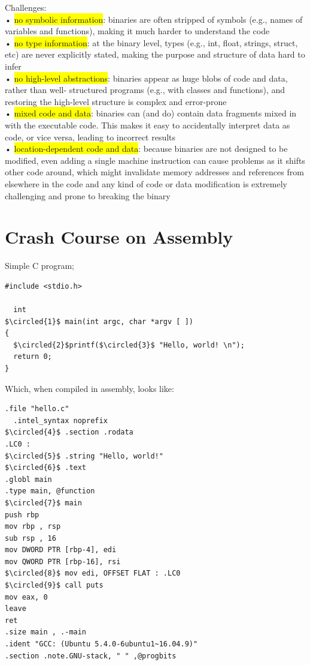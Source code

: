 \documentclass[]{project_plan}
\newcommand*\circled[1]{\tikz[baseline=(char.base)]{
            \node[shape=circle,draw,inner sep=2pt] (char) {#1};}}
\begin{document}
Challenges:\\
• \colorbox{yellow}{no symbolic information}: binaries are often stripped of symbols (e.g., names of variables and functions),
making it much harder to understand the code\\
• \colorbox{yellow}{no type information}: at the binary level, types (e.g., int, float, strings, struct, etc) are never explicitly stated,
making the purpose and structure of data hard to infer\\
• \colorbox{yellow}{no high-level abstractions}: binaries appear as huge blobs of code and data, rather than well-
structured programs (e.g., with classes and functions), and restoring the high-level structure is
complex and error-prone\\
• \colorbox{yellow}{mixed code and data}: binaries can (and do) contain data fragments mixed in with the
executable code. This makes it easy to accidentally interpret data as code, or vice versa, leading
to incorrect results\\
• \colorbox{yellow}{location-dependent code and data}: because binaries are not designed to be modified, even adding
a single machine instruction can cause problems as it shifts other code around,
which might invalidate memory addresses and references from elsewhere in the code
and any kind of code or data modification is extremely challenging and prone to breaking the binary

\section{Crash Course on Assembly}

Simple C program;
\begin{lstlisting}[mathescape]
  #include <stdio.h>

  int
$\circled{1}$ main(int argc, char *argv [ ])
{
  $\circled{2}$printf($\circled{3}$ "Hello, world! \n");
  return 0;
}
\end{lstlisting}

Which, when compiled in assembly, looks like:
\begin{lstlisting}[mathescape]
  .file "hello.c"
  .intel_syntax noprefix
$\circled{4}$ .section .rodata
.LC0 :
$\circled{5}$ .string "Hello, world!"
$\circled{6}$ .text
.globl main
.type main, @function
$\circled{7}$ main
push rbp
mov rbp , rsp
sub rsp , 16
mov DWORD PTR [rbp-4], edi
mov QWORD PTR [rbp-16], rsi
$\circled{8}$ mov edi, OFFSET FLAT : .LC0
$\circled{9}$ call puts
mov eax, 0
leave
ret
.size main , .-main
.ident "GCC: (Ubuntu 5.4.0-6ubuntu1~16.04.9)"
.section .note.GNU-stack, " " ,@progbits
\end{lstlisting}
\end{document}
